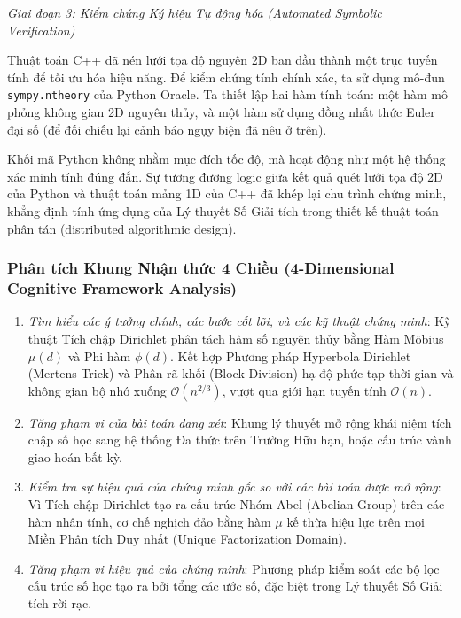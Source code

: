 \documentclass{article}
\begin{document}
\vspace{0.5em}\noindent\emph{Giai đoạn 3: Kiểm chứng Ký hiệu Tự động hóa (Automated Symbolic Verification)}

Thuật toán C++ đã nén lưới tọa độ nguyên 2D ban đầu thành một trục tuyến tính để tối ưu hóa hiệu năng. Để kiểm chứng tính chính xác, ta sử dụng mô-đun \texttt{sympy.ntheory} của Python Oracle. Ta thiết lập hai hàm tính toán: một hàm mô phỏng không gian 2D nguyên thủy, và một hàm sử dụng đồng nhất thức Euler đại số (để đối chiếu lại cảnh báo ngụy biện đã nêu ở trên).

Khối mã Python không nhằm mục đích tốc độ, mà hoạt động như một hệ thống xác minh tính đúng đắn. Sự tương đương logic giữa kết quả quét lưới tọa độ 2D của Python và thuật toán mảng 1D của C++ đã khép lại chu trình chứng minh, khẳng định tính ứng dụng của Lý thuyết Số Giải tích trong thiết kế thuật toán phân tán (distributed algorithmic design).





\subsubsection*{Phân tích Khung Nhận thức 4 Chiều (4-Dimensional Cognitive Framework Analysis)}
\begin{enumerate}
 \item \textit{Tìm hiểu các ý tưởng chính, các bước cốt lõi, và các kỹ thuật chứng minh}: Kỹ thuật Tích chập Dirichlet phân tách hàm số nguyên thủy bằng Hàm Möbius $\mu(d)$ và Phi hàm $\phi(d)$. Kết hợp Phương pháp Hyperbola Dirichlet (Mertens Trick) và Phân rã khối (Block Division) hạ độ phức tạp thời gian và không gian bộ nhớ xuống $\mathcal{O}(n^{2/3})$, vượt qua giới hạn tuyến tính $\mathcal{O}(n)$.
 \item \textit{Tăng phạm vi của bài toán đang xét}: Khung lý thuyết mở rộng khái niệm tích chập số học sang hệ thống Đa thức trên Trường Hữu hạn, hoặc cấu trúc vành giao hoán bất kỳ.

 \item \textit{Kiểm tra sự hiệu quả của chứng minh gốc so với các bài toán được mở rộng}: Vì Tích chập Dirichlet tạo ra cấu trúc Nhóm Abel (Abelian Group) trên các hàm nhân tính, cơ chế nghịch đảo bằng hàm $\mu$ kế thừa hiệu lực trên mọi Miền Phân tích Duy nhất (Unique Factorization Domain).

 \item \textit{Tăng phạm vi hiệu quả của chứng minh}: Phương pháp kiểm soát các bộ lọc cấu trúc số học tạo ra bởi tổng các ước số, đặc biệt trong Lý thuyết Số Giải tích rời rạc.
\end{enumerate}
\end{document}
